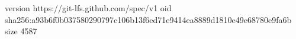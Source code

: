 version https://git-lfs.github.com/spec/v1
oid sha256:a93b6f0b037580290797c106b13f6ed71e9414ea8889d1810e49e68780e9fa6b
size 4587
